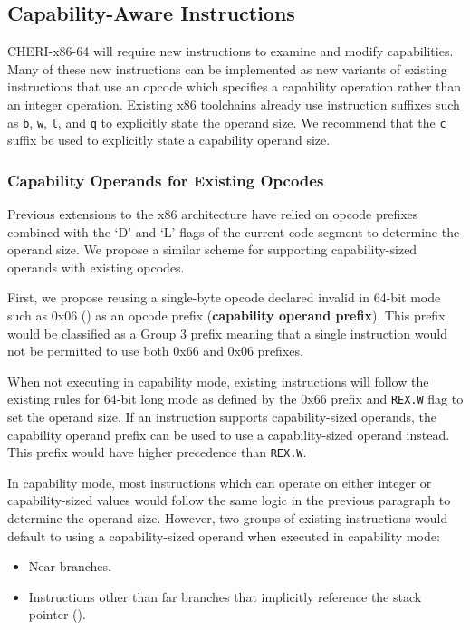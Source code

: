 \subsection{Capability-Aware Instructions}

CHERI-x86-64 will require new instructions to examine and modify
capabilities.  Many of these new instructions can be implemented as
new variants of existing instructions that use an opcode which
specifies a capability operation rather than an integer operation.
Existing x86 toolchains already use instruction suffixes such as
\texttt{b}, \texttt{w}, \texttt{l}, and \texttt{q} to explicitly state
the operand size.  We recommend that the \texttt{c} suffix be used to
explicitly state a capability operand size.

\subsubsection{Capability Operands for Existing Opcodes}

Previous extensions to the x86 architecture have relied on opcode
prefixes combined with the `D' and `L' flags of the current code
segment to determine the operand size.  We propose a similar
scheme for supporting capability-sized operands with existing
opcodes.

First, we propose reusing a single-byte opcode declared invalid in
64-bit mode such as 0x06 () as an opcode prefix
(\textbf{capability operand prefix}).  This prefix would be classified
as a Group 3 prefix meaning that a single instruction would not be
permitted to use both 0x66 and 0x06 prefixes.

When not executing in capability mode, existing instructions will
follow the existing rules for 64-bit long mode as defined by the
0x66 prefix and \texttt{REX.W} flag to set the operand size.  If an
instruction supports capability-sized operands, the capability operand
prefix can be used to use a capability-sized operand instead.  This
prefix would have higher precedence than \texttt{REX.W}.

In capability mode, most instructions which can operate on either
integer or capability-sized values would follow the same logic in the
previous paragraph to determine the operand size.  However, two groups
of existing instructions would default to using a capability-sized
operand when executed in capability mode:

\begin{itemize}
  \item Near branches.

  \item Instructions other than far branches that implicitly reference
    the stack pointer (\CSP{}).
\end{itemize}


